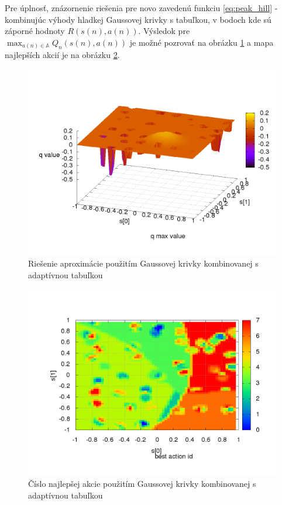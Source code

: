 \newpage
Pre úplnosť, znázornenie riešenia pre novo zavedenú funkciu  \ref{eq:peak_hill} -
kombinujúc výhody hladkej Gaussovej krivky s tabuľkou, v bodoch kde sú záporné hodnoty $R(s(n), a(n))$.
Výsledok pre $\max_{a(n) \in \mathbb{A}} Q_{n}(s(n), a(n))$ je možné pozrovať na obrázku
\ref{img:experiment_gauss_adpative_table} a mapa najlepších akcií je na obrázku
\ref{img:experiment_gauss_adpative_table_actions}.


\begin{figure}[!htb]
\centering
\includegraphics[scale=.4]{../../results_q_learning/map_2/function_type_6/iterations_10/q_learning_result.png}
\caption{Riešenie aproximácie použitím Gaussovej krivky kombinovanej s adaptívnou tabuľkou}
\label{img:experiment_gauss_adpative_table}
\end{figure}

\begin{figure}[!htb]
\centering
\includegraphics[scale=.4]{../../results_q_learning/map_2/function_type_6/iterations_10/action_best_value_log_surface.png}
\caption{Číslo najlepšej akcie použitím Gaussovej krivky kombinovanej s adaptívnou tabuľkou}
\label{img:experiment_gauss_adpative_table_actions}
\end{figure}


